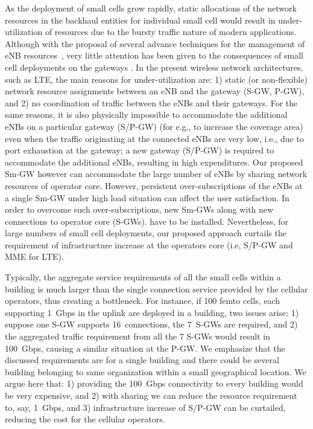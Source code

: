 \documentclass[journal,twoside,comsoc]{IEEEtran}
\begin{document}
As the deployment of small cells grow rapidly,
static allocations of the network resources in the backhaul entities
for individual small cell would result in under-utilization of resources 
due to the bursty traffic nature of modern applications.
Although with the proposal of several advance techniques for the
management of eNB resources~\cite{Shih-Fan2014,samdanis2016td, liu2015qos, alam2015towards, chen2015virtual},
very little attention has been given
to the consequences of small cell deployments on the gateways \cite{chuang2015resource}.
In the present wireless network architectures, such as LTE,
the main reasons for under-utilization are:
1) static (or non-flexible) network
resource assignments between an eNB and the gateway (S-GW, P-GW), and
2) no coordination of traffic between the eNBs and their gateways.
For the same reasons, it is also
physically impossible to accommodate the additional
eNBs on a particular gateway (S/P-GW) (for e.g., to increase the coverage area) even
when the traffic originating at the connected eNBs are very low, i.e., due to port exhaustion at the gateway;
a new gateway (S/P-GW) is required to
accommodate the additional eNBs, resulting in high expenditures. 
Our proposed Sm-GW however can accommodate
the large number of eNBs by sharing
network resources of operator core.
However, persistent over-subscriptions of the eNBs at a single Sm-GW
under high load situation can affect the user
satisfaction. In order to overcome such over-subscriptions, 
new Sm-GWs along with new connections to operator core (S-GWs).
have to be installed. Nevertheless, for large
numbers of small cell deployments, our proposed approach curtails the requirement of 
infrastructure increase at the operators core (i.e, S/P-GW and MME for LTE).

Typically, the aggregate service requirements of all the
small cells within a building is much larger than the single
connection service provided by the cellular operators, thus creating
a bottleneck.  For instance, if 100 femto cells, each
supporting 1~Gbps in the uplink are deployed in a building, two issues
arise: 1) suppose one S-GW supports 16~connections, the 7~S-GWs are
required, and 2) the aggregated traffic requirement from all the 7 S-GWs
would result in 100~Gbps, causing a similar situation at the P-GW. We
emphasize that the discussed requirements are for a single building and
there could be several building belonging to same organization
within a small geographical location.  We argue here that: 
1) providing the 100~Gbps connectivity to every
building would be very expensive, and 2) with sharing we can 
reduce the resource requirement
to, say, 1~Gbps, and 3) infrastructure increase of S/P-GW can
be curtailed, reducing the cost for the cellular operators.
\end{document}
